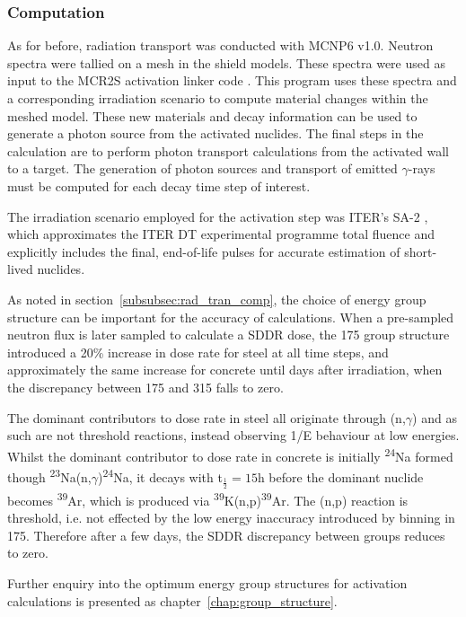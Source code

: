 \subsubsection{Computation}
As for before, radiation transport was conducted with MCNP6 v1.0. Neutron spectra were tallied on a mesh in the shield models. These spectra were used as input to the MCR2S activation linker code \cite{Davis2010a}. This program uses these spectra and a corresponding irradiation scenario to compute material changes within the meshed model. These new materials and decay information can be used to generate a photon source from the activated nuclides. The final steps in the calculation are to perform photon transport calculations from the activated wall to a target. The generation of photon sources and transport of emitted $\gamma$-rays must be computed for each decay time step of interest.

The irradiation scenario employed for the activation step was ITER's SA-2 \cite{Loughlin09}, which approximates the ITER DT experimental programme total fluence and explicitly includes the final, end-of-life pulses for accurate estimation of short-lived nuclides.

As noted in section~\ref{subsubsec:rad_tran_comp}, the choice of energy group structure can be important for the accuracy of calculations. When a pre-sampled neutron flux is later sampled to calculate a SDDR dose, the 175 group structure introduced a 20\% increase in dose rate for steel at all time steps, and approximately the same increase for concrete until days after irradiation, when the discrepancy between 175 and 315 falls to zero.

The dominant contributors to dose rate in steel all originate through (n,$\gamma$) and as such are not threshold reactions, instead observing 1/E behaviour at low energies. Whilst the dominant contributor to dose rate in concrete is initially \textsuperscript{24}Na formed though \textsuperscript{23}Na(n,$\gamma$)\textsuperscript{24}Na, it decays with t$_{\frac{1}{2}}=15$h before the dominant nuclide becomes \textsuperscript{39}Ar, which is produced via \textsuperscript{39}K(n,p)\textsuperscript{39}Ar. The (n,p) reaction is threshold, i.e. not effected by the low energy inaccuracy introduced by binning in 175. Therefore after a few days, the SDDR discrepancy between groups reduces to zero.

Further enquiry into the optimum energy group structures for activation calculations is presented as chapter~\ref{chap:group_structure}.

